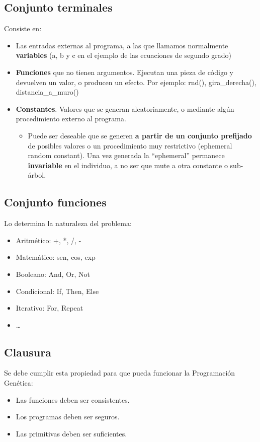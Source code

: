 \documentclass[12pt, twoside, openright]{report} %
\begin{document}
\subsection{Conjunto terminales}
Consiste en:
\begin{itemize}
	\item Las entradas externas al programa, a las que llamamos normalmente \textbf{variables} (a, b y c en el ejemplo de las ecuaciones de segundo grado)
	\item \textbf{Funciones} que no tienen argumentos. Ejecutan una pieza de código y devuelven un valor, o producen un efecto. Por ejemplo: rnd(), gira\_derecha(), distancia\_a\_muro() 
	\item \textbf{Constantes}. Valores que se generan aleatoriamente, o mediante algún procedimiento externo al programa.
	\begin{itemize}
		\item Puede ser deseable que se generen \textbf{a partir de un conjunto prefijado} de posibles valores o un procedimiento muy restrictivo (ephemeral random constant).
		Una vez generada la “ephemeral” permanece \textbf{invariable} en el individuo, a no ser que mute a otra constante o sub-árbol.
	\end{itemize}	
\end{itemize}

\subsection{Conjunto funciones}
Lo determina la naturaleza del problema:
\begin{itemize}
	\item Aritmético: +, *, /, -
	\item Matemático: sen, cos, exp
	\item Booleano: And, Or, Not
	\item Condicional: If, Then, Else
	\item Iterativo: For, Repeat
	\item …
\end{itemize}

\subsection{Clausura}
Se debe cumplir esta propiedad para que pueda funcionar la Programación Genética:
\begin{itemize}
	\item Las funciones deben ser consistentes.
	\item Los programas deben ser seguros.
	\item Las primitivas deben ser suficientes.
\end{itemize}
\end{document}
